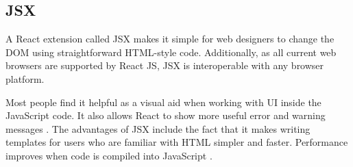 \subsection{JSX}
\label{jsx}
A React extension called JSX makes it simple for web designers to change the DOM using straightforward HTML-style code. Additionally, as all current web browsers are supported by React JS, JSX is interoperable with any browser platform.

Most people find it helpful as a visual aid when working with UI inside the JavaScript code. It also allows React to show more useful error and warning messages \autocite{react2020introducing}. The advantages of JSX include the fact that it makes writing templates for users who are familiar with HTML simpler and faster. Performance improves when code is compiled into JavaScript \autocite{phan2020react}.

